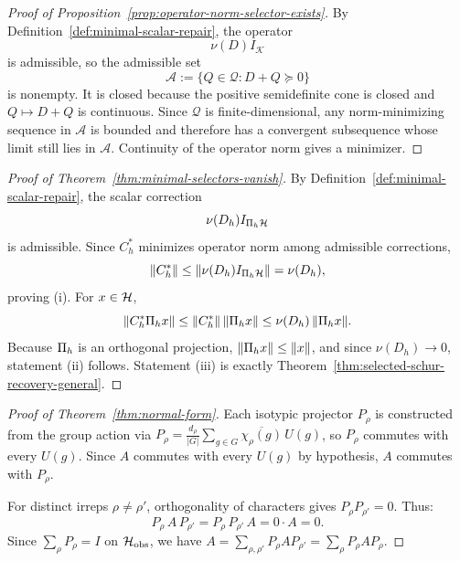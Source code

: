\begin{proof}[Proof of Proposition~\ref{prop:operator-norm-selector-exists}]
\label{proof:prop:operator-norm-selector-exists}
By Definition~\ref{def:minimal-scalar-repair}, the operator
\[
\nu(D)I_{\mathcal K}
\]
is admissible, so the admissible set
\[
\mathcal A
:=
\{Q\in\mathcal Q: D+Q\succeq 0\}
\]
is nonempty. It is closed because the positive semidefinite cone is closed and
$Q\mapsto D+Q$ is continuous. Since $\mathcal Q$ is finite-dimensional, any
norm-minimizing sequence in $\mathcal A$ is bounded and therefore has a
convergent subsequence whose limit still lies in $\mathcal A$. Continuity of
the operator norm gives a minimizer.
\end{proof}

\begin{proof}[Proof of Theorem~\ref{thm:minimal-selectors-vanish}]
\label{proof:thm:minimal-selectors-vanish}
By Definition~\ref{def:minimal-scalar-repair}, the scalar correction
\[
\nu(D_h)I_{\Pi_{h}\mathcal{H}}
\]
is admissible. Since $C_h^\ast$ minimizes operator norm among admissible
corrections,
\[
\|C_h^\ast\|
\le
\|\nu(D_h)I_{\Pi_{h}\mathcal{H}}\|
=
\nu(D_h),
\]
proving (i). For $x\in\mathcal{H}$,
\[
\|C_h^\ast \Pi_{h}x\|
\le
\|C_h^\ast\|\,\|\Pi_{h}x\|
\le
\nu(D_h)\,\|\Pi_{h}x\|.
\]
Because $\Pi_{h}$ is an orthogonal projection, $\|\Pi_{h}x\|\le \|x\|$, and
since $\nu(D_h)\to 0$, statement (ii) follows. Statement (iii) is exactly
Theorem~\ref{thm:selected-schur-recovery-general}.
\end{proof}

\begin{proof}[Proof of Theorem~\ref{thm:normal-form}]
\label{proof:thm:normal-form}
Each isotypic projector $P_\rho$ is constructed from the group action via $P_\rho = \frac{d_\rho}{|G|} \sum_{g \in G} \overline{\chi_\rho(g)}\, U(g)$, so $P_\rho$ commutes with every $U(g)$.
Since $A$ commutes with every $U(g)$ by hypothesis, $A$ commutes with $P_\rho$.

For distinct irreps $\rho \ne \rho'$, orthogonality of characters gives $P_\rho P_{\rho'} = 0$.
Thus:
\[
P_\rho \, A \, P_{\rho'} = P_\rho \, P_{\rho'} \, A = 0 \cdot A = 0.
\]
Since $\sum_\rho P_\rho = I$ on $\mathcal{H}_{\mathrm{obs}}$, we have $A = \sum_{\rho, \rho'} P_\rho A P_{\rho'} = \sum_\rho P_\rho A P_\rho$.
\end{proof}

